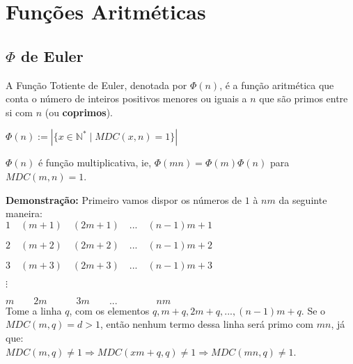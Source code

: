 
\chapter{Funções Aritméticas} %

\label{Chapter4} %


\section{$\Phi$ de Euler}

\begin{definition}
A Função Totiente de Euler, denotada por $\Phi(n)$, é a função aritmética que conta o número 
de inteiros positivos menores ou iguais a $n$ que são primos entre si com $n$ (ou \textbf{coprimos}).

$\Phi(n) := |\{ x \in \mathbb{N}^{*} \mid MDC(x,n) = 1 \}|$
\end{definition}



\begin{theorem}\label{phi_multiplicativa}
$\Phi(n)$ é função multiplicativa, ie, $\Phi(mn) = \Phi(m)\Phi(n)$ para $MDC(m,n) = 1$.
\end{theorem}
\textbf{Demonstração:}
Primeiro vamos dispor os números de $1$ à $nm$ da seguinte maneira:\\

$1\quad(m+1)\quad(2m+1)\quad...\quad(n-1)m+1$

$2\quad(m+2)\quad(2m+2)\quad...\quad(n-1)m+2$

$3\quad(m+3)\quad(2m+3)\quad...\quad(n-1)m+3$

$\vdots$

$m\quad\quad2m\quad\quad\quad3m\quad\quad...\quad\quad\quad\quad{nm}$\\

Tome a linha $q$, com os elementos $q,m+q,2m+q,...,(n-1)m+q$. Se o $MDC(m,q) = d > 1$, então nenhum termo dessa linha será primo com
$mn$, já que: 
\\

$MDC(m,q) \neq 1 \Rightarrow MDC(xm+q,q) \neq 1 \Rightarrow MDC(mn,q) \neq 1$.
\newline

